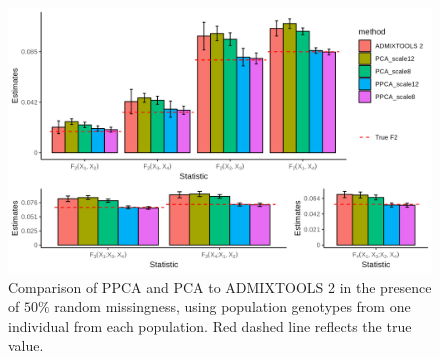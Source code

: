 \documentclass[12pt, letterpaper]{article}
\begin{document}
\begin{figure}[ht!]
    \includegraphics[width=16.5cm]{plots/simfiles/Ne1000/split_times1000/npop10_nind100/missing0.5/plots_8_12/mu0.05_plot_all_1ind_missing.png}
    \centering
    \caption{Comparison of PPCA and PCA to ADMIXTOOLS 2 in the presence of $50\%$ random missingness, using population genotypes from one individual from each population. Red dashed line reflects the true value.}
    \label{fig:comparison-adm}
\end{figure}
\end{document}
